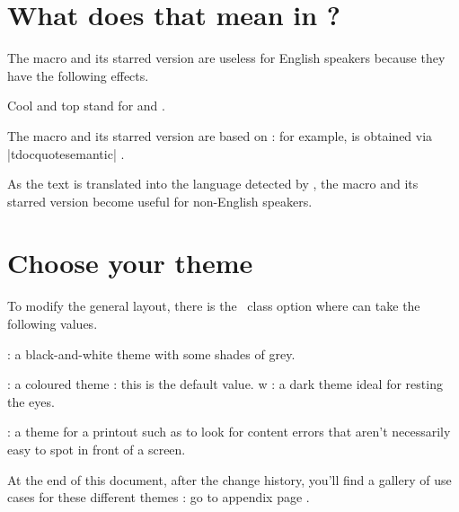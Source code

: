 \section{What does that mean in ?}

The macro  and its starred version are useless for English speakers because they have the following effects.


\begin{tdoclatex}
Cool and top stand for  and .
\end{tdoclatex}


The macro  and its starred version are based on  : for example,  is obtained via \tdoclatexin|tdocquote{semantic}| .


\begin{tdocnote}
    As the text  is translated into the language detected by \thisproj, the macro  and its starred version become useful for non-English speakers.
\end{tdocnote}


\section{Choose your theme}

To modify the general layout, there is the \thisproj\ class option  where  can take the following values.

\begin{tasks}[style=itemize]
    \task {}:
          a black-and-white theme with some shades of grey.

    \task {}:
          a coloured theme : this is the default value.
w
    \task {}:
          a dark theme ideal for resting the eyes.

    \task {}:
          a theme for a printout such as to look for content errors that aren't necessarily easy to spot in front of a screen.
\end{tasks}


\begin{tdocnote}
    At the end of this document, after the change history, you'll find a gallery of use cases for these different themes : go to appendix page \pageref{tutodoc-theme-gallery}.
\end{tdocnote}


